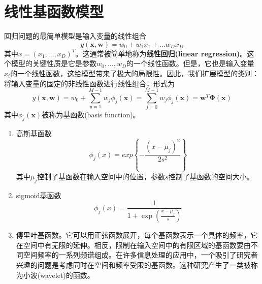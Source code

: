 \section{线性基函数模型}
回归问题的最简单模型是输入变量的线性组合
$$
y(\boldsymbol{x,w})=w_0+w_1x_1 + \dots w_Dx_D
$$
其中$x=(x_1,\dots,x_D)^T$。这通常被简单地称为\textbf{线性回归(linear regression)}。这个模型的关键性质是它是参数$w_0,\dots,w_D$的一个线性函数。但是，它也是输入变量$x_i$的一个线性函数，这给模型带来了极大的局限性。因此，我们扩展模型的类别：将输入变量的固定的非线性函数进行线性组合，形式为
$$
y(\boldsymbol{x,w})=w_0+\sum_{y=1}^{M-1}w_j\phi_j(\boldsymbol{x})=\sum_{j=0}^{M-1}w_j\phi_j(\boldsymbol{x})=\boldsymbol{w}^T\boldsymbol{\Phi}(\boldsymbol{x})
$$
其中$\phi_j(\boldsymbol{x})$被称为基函数(basis function)。
\begin{enumerate}
	\item 高斯基函数 
	$$
	\phi_j(x)=exp\left\{-\frac{(x-\mu_j)^2}{2s^2}\right\}
	$$
	其中$\mu_j$控制了基函数在输入空间中的位置，参数$s$控制了基函数的空间大小。
	\item sigmoid基函数 
	$$
	\phi_j(x)=\frac{1}{1+\exp\left(\frac{x-\mu_j}{s}\right)}
	$$
	\item 傅里叶基函数。它可以用正弦函数展开，每个基函数表示一个具体的频率，它在空间中有无限的延伸。相反，限制在输入空间中的有限区域的基函数要由不同空间频率的一系列频谱组成。在许多信息处理的应用中，一个吸引了研究者兴趣的问题是考虑同时在空间和频率受限的基函数。这种研究产生了一类被称为小波(wavelet)的函数。
\end{enumerate}
